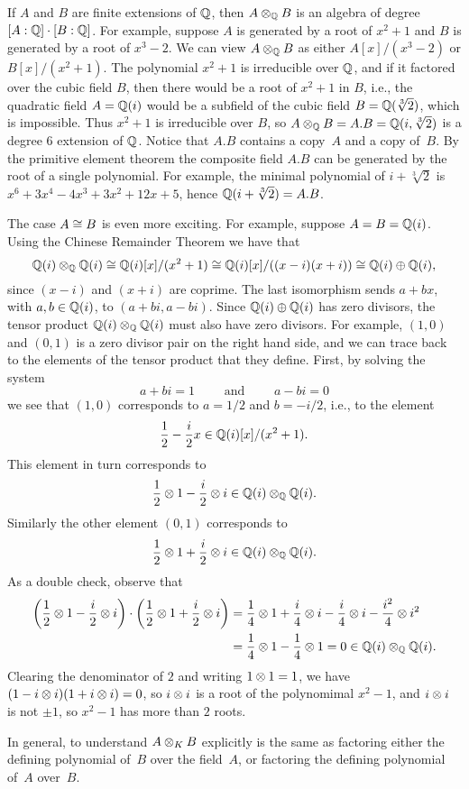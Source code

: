 \begin{example}
  If $A$ and $B$ are finite extensions of $\mathbb{Q}$, then $A\otimes_{\mathbb{Q}} B$
  is an algebra of degree $[A:\mathbb{Q}]\cdot [B:\mathbb{Q}]$. For example, suppose
  $A$ is generated by a root of $x^2+1$ and $B$ is generated by a root
  of $x^3-2$.  We can view $A\otimes_{\mathbb{Q}} B$ as either $A[x]/(x^3-2)$ or
  $B[x]/(x^2+1)$.  The polynomial $x^2+1$ is irreducible over $\mathbb{Q}$,
  and if it factored over the cubic field $B$, then there would be a
  root of $x^2+1$ in $B$, i.e., the quadratic field $A=\mathbb{Q}(i)$ would be
  a subfield of the cubic field $B=\mathbb{Q}(\sqrt[3]{2})$, which is
  impossible.  Thus $x^2+1$ is irreducible over $B$, so $A\otimes_{\mathbb{Q}} B
  = A.B = \mathbb{Q}(i,\sqrt[3]{2})$ is a degree $6$ extension of $\mathbb{Q}$.
  Notice that $A.B$ contains a copy~$A$ and a copy of~$B$. By the
  primitive element theorem the composite field $A.B$ can be generated
  by the root of a single polynomial. For example, the minimal
  polynomial of $i+\sqrt[3]{2}$ is $x^6 + 3x^4 - 4x^3 + 3x^2 + 12x +
  5$, hence $\mathbb{Q}(i+\sqrt[3]{2})=A.B$.
\end{example}

\begin{example}
  The case $A\cong B$ is even more exciting.  For example, suppose
  $A=B=\mathbb{Q}(i)$. Using the Chinese Remainder Theorem we have that
$$
  \mathbb{Q}(i)\otimes_{\mathbb{Q}} \mathbb{Q}(i) \cong \mathbb{Q}(i)[x]/(x^2+1)
\cong \mathbb{Q}(i)[x]/((x-i)(x+i))
\cong \mathbb{Q}(i) \oplus \mathbb{Q}(i),
$$
since $(x-i)$ and $(x+i)$ are coprime.  The last isomorphism
sends $a + b x$, with $a,b\in\mathbb{Q}(i)$, to $(a+bi, a-bi)$.
Since $\mathbb{Q}(i)\oplus \mathbb{Q}(i)$ has zero divisors, the tensor
product $\mathbb{Q}(i)\otimes_{\mathbb{Q}} \mathbb{Q}(i)$ must also have zero divisors.
For example, $(1,0)$ and $(0,1)$ is a zero divisor pair
on the right hand side, and we can trace back to the elements
of the tensor product that they define.  First, by solving
the system
$$ a+bi=1\qquad \text{ and }\qquad a-bi=0$$
we see that
$(1,0)$ corresponds to $a=1/2$ and $b=-i/2$, i.e., to the element
$$\frac{1}{2}- \frac{i}{2} x\in \mathbb{Q}(i)[x]/(x^2+1).$$ 
This element in turn
corresponds to 
$$
\frac{1}{2}\otimes 1 - \frac{i}{2}\otimes i \in \mathbb{Q}(i)\otimes_{\mathbb{Q}}\mathbb{Q}(i).
$$
Similarly the other element $(0,1)$ corresponds to 
$$
 \frac{1}{2}\otimes 1 + \frac{i}{2}\otimes i \in \mathbb{Q}(i)\otimes_{\mathbb{Q}}\mathbb{Q}(i).
$$
As a double check, observe that 
\begin{align*}
\left(\frac{1}{2}\otimes 1 - \frac{i}{2}\otimes i\right)\cdot
 \left(\frac{1}{2}\otimes 1 + \frac{i}{2}\otimes i\right)
&= \frac{1}{4}\otimes 1 + \frac{i}{4}\otimes i - \frac{i}{4}\otimes i
    -\frac{i^2}{4}\otimes i^2\\
 &= \frac{1}{4}\otimes 1 - \frac{1}{4}\otimes 1 = 0 \in \mathbb{Q}(i)\otimes_{\mathbb{Q}}\mathbb{Q}(i).
\end{align*}
Clearing the denominator of $2$ and writing $1\otimes 1 = 1$, we have
$(1-i\otimes i)(1+i\otimes i) = 0$, so $i\otimes i$ is a root of the
polynomimal $x^2-1$, and $i\otimes i$ is not $\pm 1$, so $x^2-1$ has
more than $2$ roots.

In general, to understand $A\otimes_K B$ explicitly 
is the same as factoring either the defining polynomial of~$B$
over the field~$A$, or factoring the defining polynomial of~$A$ 
over~$B$.
\end{example}


